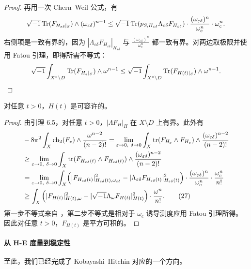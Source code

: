 \begin{proof}
再用一次 Chern--Weil 公式，有
\[
\sqrt{-1}\operatorname{Tr}(F_{H_{\varepsilon\delta}|_S})\wedge (\omega_{\varepsilon\delta})^{n-1}
\le
\sqrt{-1}\operatorname{Tr}(p_{S,H_{\varepsilon\delta}}\Lambda_{\varepsilon\delta} F_{H_{\varepsilon\delta}})
\cdot
\frac{(\omega_{\varepsilon\delta})^n}{\omega_c^n}\cdot \omega_c^n.
\]
右侧项是一致有界的，因为 \(|\Lambda_{\varepsilon\delta} F_{H_{\varepsilon\delta}}|_{H_{\varepsilon\delta}}\) 与 \(\frac{(\omega_{\varepsilon\delta})^n}{\omega_c^n}\) 都一致有界。对两边取极限并使用 Fatou 引理，即得所需不等式：
\[
\sqrt{-1}\int_{X^\circ\setminus D}\operatorname{Tr}(F_{H_{\varepsilon}|_S})\wedge \omega^{n-1}
\le
\sqrt{-1}\int_{X^\circ\setminus D}\operatorname{Tr}(F_{H(t)|_S})\wedge \omega^{n-1}.
\]
\end{proof}

\begin{proposition}
对任意 \(t>0\)，\(H(t)\) 是可容许的。
\end{proposition}

\begin{proof}
由引理 6.5，对任意 \(t>0\)，\(|\Lambda F_H|_H\) 在 \(X\setminus D\) 上有界。此外有
\begin{align}
&-8\pi^2
\int_X \operatorname{ch}_2(F_*)\wedge \frac{\omega^{n-2}}{(n-2)!}
=
\lim_{\varepsilon\to 0,\ \delta\to 0}
\int_X
\operatorname{tr}(F_{H_{\varepsilon}}\wedge F_{H_{\varepsilon}})\wedge \frac{(\omega_{\varepsilon\delta})^{n-2}}{(n-2)!}
\nonumber\\
&\ge
\lim_{\varepsilon\to 0,\ \delta\to 0}
\int_X
\operatorname{tr}(F_{H_{\varepsilon\delta}(t)}\wedge F_{H_{\varepsilon\delta}(t)})\wedge
\frac{(\omega_{\varepsilon\delta})^{n-2}}{(n-2)!}
\nonumber\\
&=
\lim_{\varepsilon\to 0,\ \delta\to 0}
\int_X
\Bigl(
|F_{H_{\varepsilon\delta}(t)}|^2_{H_{\varepsilon\delta}(t),\omega_{\varepsilon\delta}}
-
|\Lambda_{\varepsilon\delta} F_{H_{\varepsilon\delta}(t)}|^2_{H_{\varepsilon\delta}(t)}
\Bigr)
\cdot
\frac{(\omega_{\varepsilon\delta})^n}{\omega_c^n}
\cdot
\frac{\omega_c^n}{n!}
\nonumber\\
&\ge
\int_X
\left(
|F_{H(t)}|^2_{H(t),\omega}
-
|\sqrt{-1}\Lambda_\omega F_{H(t)}|^2_{H(t)}
\right)\cdot \frac{\omega^n}{n!}. \tag{27}
\end{align}
第一步不等式来自 \cite[Lemma 7.1]{Li}，第二步不等式是相对于 \(\omega_c\) 诱导测度应用 Fatou 引理所得。因此对任意 \(t>0\)，\(F_{H(t)}\) 是平方可积的。
\end{proof}

\paragraph{从 H-E 度量到稳定性}
至此，我们已经完成了 Kobayashi--Hitchin 对应的一个方向。


